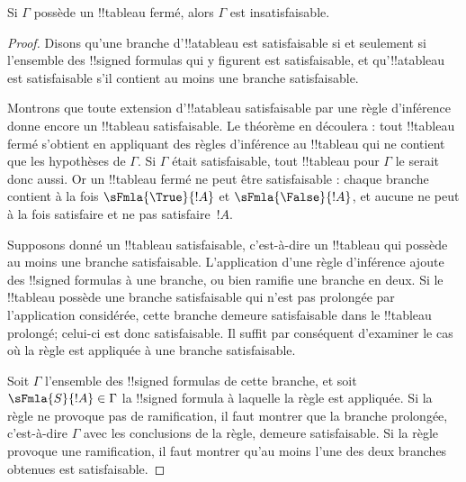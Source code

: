 \documentclass[11pt,a4paper,openany]{memoir}
\begin{document}
\begin{thm}[Correction]
  Si $\Gamma$ possède un !!{tableau} fermé, alors $\Gamma$ est
  insatisfaisable.
\end{thm}

\begin{proof}
Disons qu'une branche d'!!a{tableau} est satisfaisable si et seulement
si l'ensemble des !!{signed formula}s qui y figurent est satisfaisable,
et qu'!!a{tableau} est satisfaisable s'il contient au moins une branche
satisfaisable.

Montrons que toute extension d'!!a{tableau} satisfaisable par une règle
d'inférence donne encore un !!{tableau} satisfaisable. Le théorème en
découlera : tout !!{tableau} fermé s'obtient en appliquant des règles
d'inférence au !!{tableau} qui ne contient que les hypothèses de
$\Gamma$. Si $\Gamma$ était satisfaisable, tout !!{tableau} pour
$\Gamma$ le serait donc aussi. Or un !!{tableau} fermé ne peut être
satisfaisable : chaque branche contient à la fois
$\sFmla{\True}{!A}$ et $\sFmla{\False}{!A}$, et aucune
 ne peut à la fois satisfaire et ne
pas satisfaire~$!A$.

Supposons donné un !!{tableau} satisfaisable, c'est-à-dire un
!!{tableau} qui possède au moins une branche satisfaisable. L'application
d'une règle d'inférence ajoute des !!{signed formula}s à une branche,
ou bien ramifie une branche en deux. Si le !!{tableau} possède une
branche satisfaisable qui n'est pas prolongée par l'application
considérée, cette branche demeure satisfaisable dans le !!{tableau}
prolongé; celui-ci est donc satisfaisable. Il suffit par conséquent
d'examiner le cas où la règle est appliquée à une branche satisfaisable.

Soit $\Gamma$ l'ensemble des !!{signed formula}s de cette branche, et
soit $\sFmla{S}{!A} \in \Gamma$ la !!{signed formula} à laquelle la
règle est appliquée. Si la règle ne provoque pas de ramification, il
faut montrer que la branche prolongée, c'est-à-dire $\Gamma$ avec les
conclusions de la règle, demeure satisfaisable. Si la règle provoque
une ramification, il faut montrer qu'au moins l'une des deux branches
obtenues est satisfaisable.
  

\end{proof}
\end{document}

